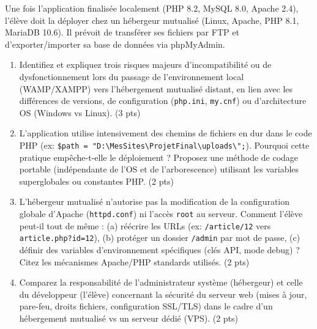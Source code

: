 \documentclass[11pt]{article}
\begin{document}
\begin{exercice}
Une fois l'application finalisée localement (PHP 8.2, MySQL 8.0, Apache 2.4), l'élève doit la déployer chez un hébergeur mutualisé (Linux, Apache, PHP 8.1, MariaDB 10.6). Il prévoit de transférer ses fichiers par FTP et d'exporter/importer sa base de données via phpMyAdmin.

\begin{enumerate}
    \item Identifiez et expliquez trois risques majeurs d'incompatibilité ou de dysfonctionnement lors du passage de l'environnement local (WAMP/XAMPP) vers l'hébergement mutualisé distant, en lien avec les différences de versions, de configuration (\texttt{php.ini}, \texttt{my.cnf}) ou d'architecture OS (Windows vs Linux). (3 pts)
    \item L'application utilise intensivement des chemins de fichiers en dur dans le code PHP (ex: \verb|$path = "D:\MesSites\ProjetFinal\uploads\";|). Pourquoi cette pratique empêche-t-elle le déploiement ? Proposez une méthode de codage portable (indépendante de l'OS et de l'arborescence) utilisant les variables superglobales ou constantes PHP. (2 pts)
    \item L'hébergeur mutualisé n'autorise pas la modification de la configuration globale d'Apache (\texttt{httpd.conf}) ni l'accès \texttt{root} au serveur. Comment l'élève peut-il tout de même : (a) réécrire les URLs (ex: \texttt{/article/12} vers \texttt{article.php?id=12}), (b) protéger un dossier \texttt{/admin} par mot de passe, (c) définir des variables d'environnement spécifiques (clés API, mode debug) ? Citez les mécanismes Apache/PHP standards utilisés. (2 pts)
    \item Comparez la responsabilité de l'administrateur système (hébergeur) et celle du développeur (l'élève) concernant la sécurité du serveur web (mises à jour, pare-feu, droits fichiers, configuration SSL/TLS) dans le cadre d'un hébergement mutualisé vs un serveur dédié (VPS). (2 pts)
\end{enumerate}
\end{exercice}
\end{document}
